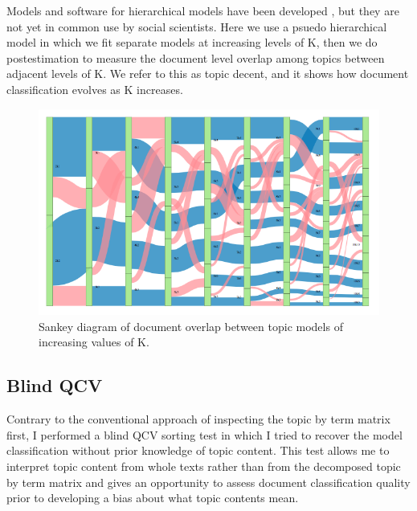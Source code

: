 \documentclass[]{book}
\theoremstyle{definition}
\theoremstyle{definition}
\theoremstyle{definition}
\theoremstyle{remark}
\begin{document}
Models and software for hierarchical models have been developed
\citep{Teh2006Hierarchical, Roberts2015pkg}, but they are not yet in
common use by social scientists. Here we use a psuedo hierarchical model
in which we fit separate models at increasing levels of K, then we do
postestimation to measure the document level overlap among topics
between adjacent levels of K. We refer to this as topic decent, and it
shows how document classification evolves as K increases.

\begin{figure}

{\centering \includegraphics[width=1\linewidth]{img/genre-sankey} 

}

\caption{Sankey diagram of document overlap between topic models of increasing values of K.}\label{fig:sankey}
\end{figure}

\hypertarget{blind-qcv}{%
\subsection{Blind QCV}\label{blind-qcv}}

Contrary to the conventional approach of inspecting the topic by term
matrix first, I performed a blind QCV sorting test in which I tried to
recover the model classification without prior knowledge of topic
content. This test allows me to interpret topic content from whole texts
rather than from the decomposed topic by term matrix and gives an
opportunity to assess document classification quality prior to
developing a bias about what topic contents mean.
\end{document}
